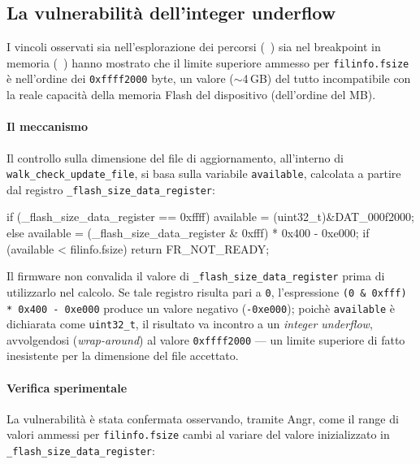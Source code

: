     \subsection{La vulnerabilità dell'integer underflow}
    \label{subsec:vulnerabilitá_integer_underflow}
        I vincoli osservati sia nell'esplorazione dei percorsi (~) sia nel breakpoint in memoria (~) hanno mostrato che il limite superiore ammesso per \texttt{filinfo.fsize} è nell'ordine dei \texttt{0xffff2000} byte, un valore ($\sim$4\,GB) del tutto incompatibile con la reale capacità della memoria Flash del dispositivo (dell'ordine del MB).

    \paragraph{Il meccanismo}

        Il controllo sulla dimensione del file di aggiornamento, all'interno 
        di \texttt{walk\_check\_update\_file}, si basa sulla variabile 
        \texttt{available}, calcolata a partire dal registro 
        \texttt{\_flash\_size\_data\_register}:

\begin{clangcode}
if (_flash_size_data_register == 0xffff) {
    available = (uint32_t)&DAT_000f2000;
} else {
    available = (_flash_size_data_register & 0xfff) * 0x400 - 0xe000;
}
if (available < filinfo.fsize) {
    return FR_NOT_READY;
}
\end{clangcode}

        Il firmware non convalida il valore di 
        \texttt{\_flash\_size\_data\_register} prima di utilizzarlo nel 
        calcolo. Se tale registro risulta pari a \texttt{0}, l'espressione 
        \texttt{(0 \& 0xfff) * 0x400 - 0xe000} produce un valore negativo 
        (\texttt{-0xe000}); poichè \texttt{available} è dichiarata come 
        \texttt{uint32\_t}, il risultato va incontro a un \textit{integer 
        underflow}, avvolgendosi (\textit{wrap-around}) al valore 
        \texttt{0xffff2000} — un limite superiore di fatto inesistente per la 
        dimensione del file accettato.
        
        \paragraph{Verifica sperimentale}
        
        La vulnerabilità è stata confermata osservando, tramite Angr, come il 
        range di valori ammessi per \texttt{filinfo.fsize} cambi al variare del 
        valore inizializzato in \texttt{\_flash\_size\_data\_register}:

